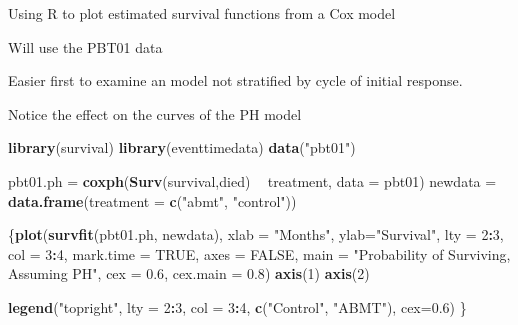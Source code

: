 \documentclass[ignorenonframetext,]{beamer}
\newenvironment{Shaded}{\begin{snugshade}}{\end{snugshade}}
\newcommand{\DataTypeTok}[1]{\textcolor[rgb]{0.13,0.29,0.53}{#1}}
\newcommand{\DecValTok}[1]{\textcolor[rgb]{0.00,0.00,0.81}{#1}}
\newcommand{\FloatTok}[1]{\textcolor[rgb]{0.00,0.00,0.81}{#1}}
\newcommand{\KeywordTok}[1]{\textcolor[rgb]{0.13,0.29,0.53}{\textbf{#1}}}
\newcommand{\NormalTok}[1]{#1}
\newcommand{\OperatorTok}[1]{\textcolor[rgb]{0.81,0.36,0.00}{\textbf{#1}}}
\newcommand{\OtherTok}[1]{\textcolor[rgb]{0.56,0.35,0.01}{#1}}
\newcommand{\StringTok}[1]{\textcolor[rgb]{0.31,0.60,0.02}{#1}}
\begin{document}
\begin{frame}{%
\protect\hypertarget{using-r-to-plot-estimated-survival-functions-from-a-cox-model}{%
Using R to plot estimated survival functions from a Cox model}}

Will use the PBT01 data

Easier first to examine an model not stratified by cycle of initial
response.

Notice the effect on the curves of the PH model

\end{frame}

\begin{frame}[fragile]

\scriptsize

\begin{Shaded}
\begin{Highlighting}[]
\KeywordTok{library}\NormalTok{(survival)}
\KeywordTok{library}\NormalTok{(eventtimedata)}
\KeywordTok{data}\NormalTok{(}\StringTok{"pbt01"}\NormalTok{)}

\NormalTok{pbt01.ph =}\StringTok{ }\KeywordTok{coxph}\NormalTok{(}\KeywordTok{Surv}\NormalTok{(survival,died) }\OperatorTok{~}\StringTok{ }\NormalTok{treatment,}
              \DataTypeTok{data =}\NormalTok{ pbt01)}
\NormalTok{newdata =}\StringTok{ }\KeywordTok{data.frame}\NormalTok{(}\DataTypeTok{treatment =} \KeywordTok{c}\NormalTok{(}\StringTok{"abmt"}\NormalTok{, }\StringTok{"control"}\NormalTok{))}

\NormalTok{\{}\KeywordTok{plot}\NormalTok{(}\KeywordTok{survfit}\NormalTok{(pbt01.ph, newdata), }\DataTypeTok{xlab =} \StringTok{"Months"}\NormalTok{, }\DataTypeTok{ylab=}\StringTok{"Survival"}\NormalTok{, }
     \DataTypeTok{lty =} \DecValTok{2}\OperatorTok{:}\DecValTok{3}\NormalTok{, }\DataTypeTok{col =} \DecValTok{3}\OperatorTok{:}\DecValTok{4}\NormalTok{, }\DataTypeTok{mark.time =} \OtherTok{TRUE}\NormalTok{,}
     \DataTypeTok{axes =} \OtherTok{FALSE}\NormalTok{, }
     \DataTypeTok{main =} \StringTok{"Probability of Surviving, Assuming PH"}\NormalTok{,}
     \DataTypeTok{cex =} \FloatTok{0.6}\NormalTok{, }
     \DataTypeTok{cex.main =} \FloatTok{0.8}\NormalTok{)}
\KeywordTok{axis}\NormalTok{(}\DecValTok{1}\NormalTok{)}
\KeywordTok{axis}\NormalTok{(}\DecValTok{2}\NormalTok{)}

\KeywordTok{legend}\NormalTok{(}\StringTok{"topright"}\NormalTok{, }\DataTypeTok{lty =} \DecValTok{2}\OperatorTok{:}\DecValTok{3}\NormalTok{, }\DataTypeTok{col =} \DecValTok{3}\OperatorTok{:}\DecValTok{4}\NormalTok{,}
       \KeywordTok{c}\NormalTok{(}\StringTok{"Control"}\NormalTok{, }\StringTok{"ABMT"}\NormalTok{),}
       \DataTypeTok{cex=}\FloatTok{0.6}\NormalTok{)}
\NormalTok{\}}
\end{Highlighting}
\end{Shaded}

\end{frame}
\end{document}
